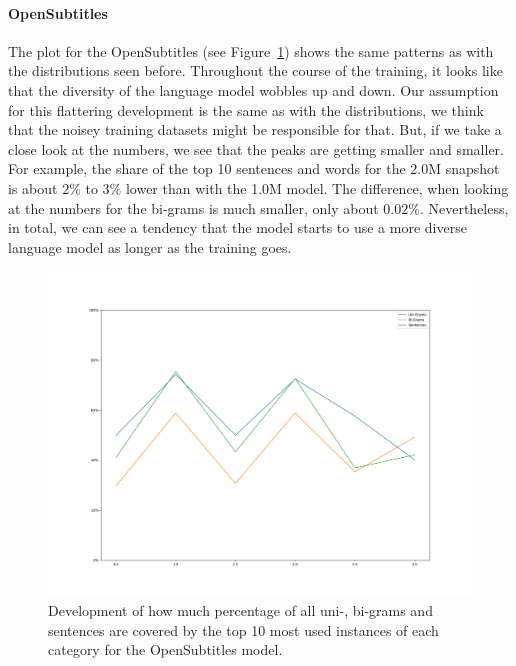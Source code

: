 \paragraph{OpenSubtitles} The plot for the OpenSubtitles (see Figure~\ref{results:language_model:diversity:opensubtitles}) shows the same patterns as with the distributions seen before. Throughout the course of the training, it looks like that the diversity of the language model wobbles up and down. Our assumption for this flattering development is the same as with the distributions, we think that the noisey training datasets might be responsible for that. But, if we take a close look at the numbers, we see that the peaks are getting smaller and smaller. For example, the share of the top 10 sentences and words for the 2.0M snapshot is about $2\%$ to $3\%$ lower than with the 1.0M model. The difference, when looking at the numbers for the bi-grams is much smaller, only about $0.02\%$. Nevertheless, in total, we can see a tendency that the model starts to use a more diverse language model as longer as the training goes.

\begin{figure}[H]
	\includegraphics[width=\linewidth]{img/plots/opensubtitles_not_reversed/diversity_perc_plot.png}
	\caption{Development of how much percentage of all uni-, bi-grams and sentences are covered by the top 10 most used instances of each category for the OpenSubtitles model.}
	\label{results:language_model:diversity:opensubtitles}
\end{figure}

